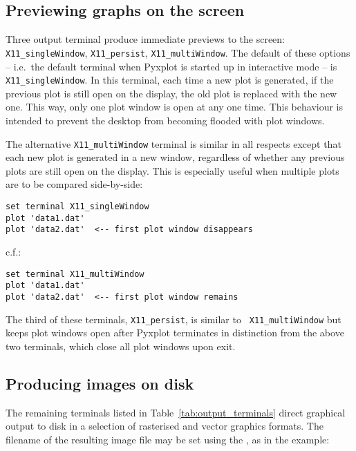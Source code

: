 \subsection{Previewing graphs on the screen}

Three output terminal produce immediate previews to the screen: {\tt
X11\_\-single\-Window}, {\tt X11\_\-persist}, {\tt X11\_\-multi\-Window}.  The
default of these options -- i.e.\ the default terminal when Pyxplot is started
up in interactive mode -- is {\tt X11\_\-single\-Window}.  In this terminal,
each time a new plot is generated, if the previous plot is still open on the
display, the old plot is replaced with the new one. This way, only one plot
window is open at any one time. This behaviour is intended to prevent the
desktop from becoming flooded with plot windows.

The alternative {\tt X11\_\-multi\-Window} terminal is similar in all respects
except that each new plot is generated in a new window, regardless of whether
any previous plots are still open on the display. This is especially useful
when multiple plots are to be compared side-by-side:

\begin{verbatim}
set terminal X11_singleWindow
plot 'data1.dat'
plot 'data2.dat'  <-- first plot window disappears
\end{verbatim}

\noindent c.f.:

\begin{verbatim}
set terminal X11_multiWindow
plot 'data1.dat'
plot 'data2.dat'  <-- first plot window remains
\end{verbatim}

The third of these terminals, {\tt X11\_\-persist}, is similar to {\tt
X11\_\-multi\-Window} but keeps plot windows open after Pyxplot terminates in
distinction from the above two terminals, which close all plot windows upon
exit.

\subsection{Producing images on disk}

The remaining terminals listed in Table~\ref{tab:output_terminals} direct
graphical output to disk in a selection of rasterised and vector graphics
formats. The filename of the resulting image file may be set using the
, as in the example:

